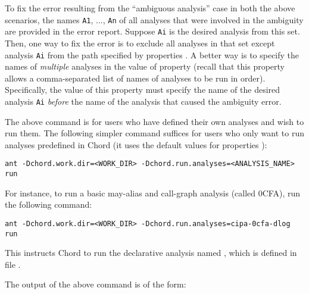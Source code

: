 To fix the error resulting from the ``ambiguous analysis'' case in both the above scenarios,
the names {\tt A1}, ..., {\tt An} of all analyses that were involved in the ambiguity are
provided in the error report.  Suppose {\tt Ai} is the desired analysis from this set.
Then, one way to fix the error is to exclude all analyses in that set except analysis {\tt Ai}
from the path specified by properties .
A better way is to specify the names of {\it multiple} analyses in the value of property
 (recall that this property
allows a comma-separated list of names of analyses to be run in order).
Specifically, the value of this property must specify the name of the desired analysis {\tt Ai} 
{\it before} the name of the analysis that caused the ambiguity error.

The above command is for users who have defined their own analyses and wish to run them.
The following simpler command suffices for users who only want to run analyses predefined
in Chord (it uses the default values for properties ):

\begin{framed}
\begin{verbatim}
ant -Dchord.work.dir=<WORK_DIR> -Dchord.run.analyses=<ANALYSIS_NAME> run
\end{verbatim}
\end{framed}

For instance, to run a basic may-alias and call-graph analysis (called 0CFA),
run the following command:

\begin{framed}
\begin{verbatim}
ant -Dchord.work.dir=<WORK_DIR> -Dchord.run.analyses=cipa-0cfa-dlog run
\end{verbatim}
\end{framed}

This instructs Chord to run the declarative analysis named ,
which is defined in file .

The output of the above command is of the form:

